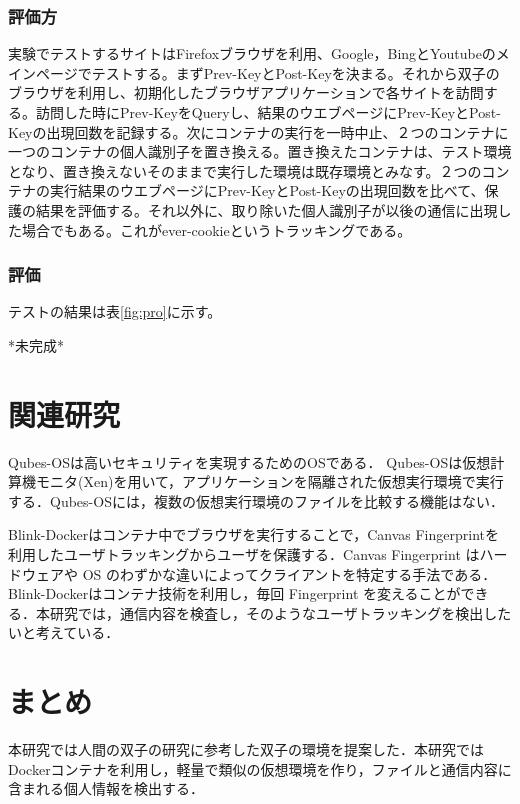 \documentclass[submit]{ipsj}
\begin{document}
\subsubsection{評価方}
実験でテストするサイトはFirefoxブラウザを利用、Google，BingとYoutubeのメインページでテストする。まずPrev-KeyとPost-Keyを決まる。それから双子のブラウザを利用し、初期化したブラウザアプリケーションで各サイトを訪問する。訪問した時にPrev-KeyをQueryし、結果のウエブページにPrev-KeyとPost-Keyの出現回数を記録する。次にコンテナの実行を一時中止、２つのコンテナに一つのコンテナの個人識別子を置き換える。置き換えたコンテナは、テスト環境となり、置き換えないそのままで実行した環境は既存環境とみなす。２つのコンテナの実行結果のウエブページにPrev-KeyとPost-Keyの出現回数を比べて、保護の結果を評価する。それ以外に、取り除いた個人識別子が以後の通信に出現した場合でもある。これがever-cookie\cite{forget}というトラッキングである。


\subsubsection{評価}
テストの結果は表\ref{fig:pro}に示す。

*未完成*






\section{関連研究}
Qubes-OS\cite{qubes}は高いセキュリティを実現するためのOSである． Qubes-OSは仮想計算機モニタ(Xen)を用いて，アプリケーションを隔離された仮想実行環境で実行する．Qubes-OSには，複数の仮想実行環境のファイルを比較する機能はない．

Blink-Docker\cite{blink}はコンテナ中でブラウザを実行することで，Canvas Fingerprintを利用したユーザトラッキングからユーザを保護する．Canvas Fingerprint はハードウェアや OS のわずかな違いによってクライアントを特定する手法である．Blink-Dockerはコンテナ技術を利用し，毎回 Fingerprint を変えることができる．本研究では，通信内容を検査し，そのようなユーザトラッキングを検出したいと考えている．



\section{まとめ}
本研究では人間の双子の研究に参考した双子の環境を提案した．本研究ではDockerコンテナを利用し，軽量で類似の仮想環境を作り，ファイルと通信内容に含まれる個人情報を検出する．
\end{document}

